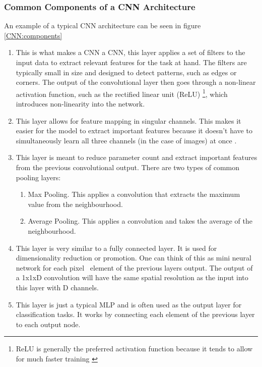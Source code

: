 \subsubsection*{Common Components of a CNN Architecture} \label{CNN:components}
An example of a typical CNN architecture can be seen in figure \ref{CNN:components}
\begin{enumerate}[align=left]
	\item[Convolutional Layer:] This is what makes a CNN a CNN, this layer applies a set of filters to the input data to extract relevant features for the task at hand. The filters are typically small in size and designed to detect patterns, such as edges or corners. The output of the convolutional layer then goes through a non-linear activation function, such as the rectified linear unit (ReLU) \footnote{ReLU is generally the preferred activation function because it tends to allow for much faster training \cite{krizhevsky2017imagenet}}, which introduces non-linearity into the network.
	\item[Deepthwise Convolutional Layer:] This layer allows for feature mapping in singular channels. This makes it easier for the model to extract important features because it doesn't have to simultaneously learn all three channels (in the case of images) at once \cite{chollet2017xception}.
	\item[Pooling Layer:] This layer is meant to reduce parameter count and extract important features from the previous convolutional output. There are two types of common pooling layers: \begin{enumerate}
		\item[1:] Max Pooling. This applies a convolution that extracts the maximum value from the neighbourhood.
		\item[2:] Average Pooling. This applies a convolution and takes the average of the neighbourhood.
	\end{enumerate}
	\item[1x1 Convolutional layer:] This layer is very similar to a fully connected layer. It is used for dimensionality reduction or promotion. One can think of this as mini neural network for each pixel \ element of the previous layers output. The output of a 1x1xD convolution will have the same spatial resolution as the input into this layer with D channels.
	\item[Fully Connected Layer:] This layer is just a typical MLP and is often used as the output layer for classification tasks. It works by connecting each element of the previous layer to each output node.
\end{enumerate}

